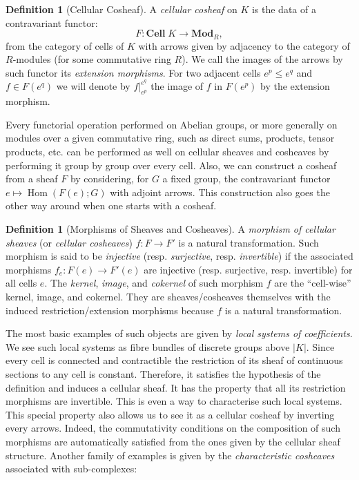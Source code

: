 \documentclass[10pt]{amsart}
\theoremstyle{definition}
\newtheorem{defi}[theo]{Definition}
\numberwithin{equation}{section}
\numberwithin{figure}{section}
\DeclareMathOperator{\Hom}{Hom}
\newcommand{\Cell}{\mathbf{Cell}}
\newcommand{\Mod}{\mathbf{Mod}}
\begin{document}
\begin{defi}[Cellular Cosheaf]
A \emph{cellular cosheaf} on $K$ is the data of a contravariant functor:
\begin{equation*}
F:\Cell\;K\rightarrow \Mod_R,
\end{equation*}
from the category of cells of $K$ with arrows given by adjacency to the category of $R$-modules (for some commutative ring $R$). We call the images of the arrows by such functor its \emph{extension morphisms}. For two adjacent cells $e^p\leq e^q$ and $f\in F(e^q)$ we will denote by $f|^{e^q}_{e^p}$ the image of $f$ in $F(e^p)$ by the extension morphism.
\end{defi}

Every functorial operation performed on Abelian groups, or more generally on modules over a given commutative ring, such as direct sums, products, tensor products, etc. can be performed as well on cellular sheaves and cosheaves by performing it group by group over every cell. Also, we can construct a cosheaf from a sheaf $F$ by considering, for $G$ a fixed group, the contravariant functor $e\mapsto \Hom(F(e);G)$ with adjoint arrows. This construction also goes the other way around when one starts with a cosheaf.

\begin{defi}[Morphisms of Sheaves and Cosheaves]
A \emph{morphism of cellular sheaves} (or \emph{cellular cosheaves}) $f:F\rightarrow F'$ is a natural transformation. Such morphism is said to be \emph{injective} (resp. \emph{surjective}, resp. \emph{invertible}) if the associated morphisms $f_e:F(e)\rightarrow F'(e)$ are injective (resp. surjective, resp. invertible) for all cells $e$. The \emph{kernel}, \emph{image}, and \emph{cokernel} of such morphism $f$ are the ``cell-wise'' kernel, image, and cokernel. They are sheaves/cosheaves themselves with the induced restriction/extension morphisms because $f$ is a natural transformation.
\end{defi}

The most basic examples of such objects are given by \emph{local systems of coefficients}. We see such local systems as fibre bundles of discrete groups above $|K|$. Since every cell is connected and contractible the restriction of its sheaf of continuous sections to any cell is constant. Therefore, it satisfies the hypothesis of the definition and induces a cellular sheaf. It has the property that all its restriction morphisms are invertible. This is even a way to characterise such local systems. This special property also allows us to see it as a cellular cosheaf by inverting every arrows. Indeed, the commutativity conditions on the composition of such morphisms are automatically satisfied from the ones given by the cellular sheaf structure. Another family of examples is given by the \emph{characteristic cosheaves} associated with sub-complexes:
\end{document}
